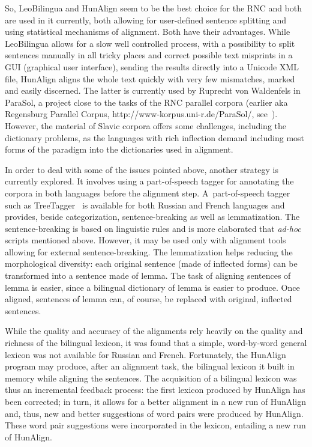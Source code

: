 \begin{multicols}{2}
  So, LeoBilingua and HunAlign seem to be the best choice for the RNC and both are 
used in it currently, both allowing for user-defined sentence splitting and using statistical 
mechanisms of alignment. Both have their advantages. While LeoBilingua allows for a slow well 
controlled process, with a possibility to split sentences manually in all tricky places and correct 
possible text misprints in a GUI (graphical user interface), sending the results directly into a Unicode XML file, HunAlign 
aligns the whole text quickly with very few mismatches, marked and easily discerned. The latter is 
currently used by Ruprecht von Waldenfels in ParaSol, a project close to the tasks of the RNC 
parallel corpora (earlier aka Regensburg Parallel Corpus, {\sf http://www-korpus.uni-r.de/ParaSol/}, 
see~\cite{35-zat}). However, the material of Slavic corpora offers some challenges, including the 
dictionary problems, as the languages with rich inflection demand including most forms of the 
paradigm into the dictionaries used in alignment.
   
   In order to deal with some of the issues pointed above, another strategy is currently explored. It 
involves using a part-of-speech tagger for annotating the corpora in both languages before the 
alignment step. A~part-of-speech tagger such as TreeTagger~\cite{36-zat} is available for both 
Russian and French languages and provides, beside categorization, sentence-breaking as well as 
lemmatization. The sentence-breaking is based on linguistic rules and is more elaborated that 
\textit{ad-hoc} scripts mentioned above. However, it may be used only with alignment tools 
allowing for external sentence-breaking. The lemmatization helps reducing the morphological 
diversity: each original sentence (made of inflected forms) can be transformed into a sentence made 
of lemma. The task of aligning sentences of lemma is easier, since a bilingual dictionary of lemma 
is easier to produce. Once aligned, sentences of lemma can, of course, be replaced with original, 
inflected sentences.
   
   While the quality and accuracy of the alignments rely heavily on the quality and richness of the 
bilingual lexicon, it was found that a simple, word-by-word general lexicon was not available for 
Russian and French. Fortunately, the HunAlign program may produce, after an alignment task, the 
bilingual lexicon it built in memory while aligning the sentences. The acquisition of a bilingual 
lexicon was thus an incremental feedback process: the first lexicon produced by HunAlign has been 
corrected; in turn, it allows for a better alignment in a new run of HunAlign and, thus, new and 
better suggestions of word pairs were produced by HunAlign. These word pair suggestions were 
incorporated in the lexicon, entailing a new run of HunAlign.


\end{multicols}
